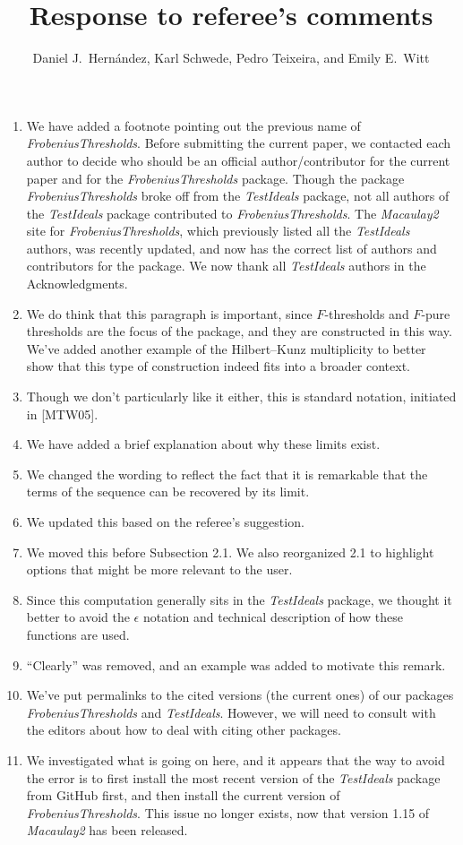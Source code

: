 \documentclass{amsart}
\begin{document}
\title{Response to referee's comments}
\author{Daniel J.\ Hern\'andez,  Karl Schwede, Pedro Teixeira, and Emily E.\ Witt}
\maketitle

\begin{enumerate}
\item We have added a footnote pointing out the previous name of \emph{FrobeniusThresholds}.  Before submitting the current paper, we contacted each author to decide who should be an official author/contributor for the current paper and for the \emph{FrobeniusThresholds} package.
Though the package \emph{FrobeniusThresholds} broke off from the \emph{TestIdeals} package, not all authors of the \emph{TestIdeals} package contributed to \emph{FrobeniusThresholds}.
The \emph{Macaulay2} site for \emph{FrobeniusThresholds}, which previously listed all the \emph{TestIdeals} authors, was recently updated, and now has the correct list of authors and contributors for the package. 
We now thank all \emph{TestIdeals} authors in the Acknowledgments. 
\item We do think that this paragraph is important, since $F$-thresholds and $F$-pure thresholds are the focus of the package, and they are constructed in this way.  We've added another example of the Hilbert--Kunz multiplicity to better show that this type of construction indeed fits into a broader context. 
\item Though we don't particularly like it either, this is standard notation, initiated in [MTW05].
\item We have added a brief explanation about why these limits exist. 
\item We changed the wording to reflect the fact that it is remarkable that the terms of the sequence can be recovered by its limit. 
\item We updated this based on the referee's suggestion. 
\item We moved this before Subsection 2.1.  We also reorganized 2.1 to highlight options that might be more relevant to the user. 
\item Since this computation generally sits in the \emph{TestIdeals} package, we thought it better to avoid the  $\epsilon$ notation and technical description of how these functions are used. 
\item ``Clearly'' was removed, and an example was added to motivate this remark. 
\item We've put permalinks to the cited versions (the current ones) of our packages  \emph{FrobeniusThresholds} and \emph{TestIdeals}. 
However, we will need to consult with the editors about how to deal with citing other packages.  
\item We investigated what is going on here, and it appears that the way to avoid the error is to first install the most recent version of the \emph{TestIdeals} package from GitHub first, and then install the current version of \emph{FrobeniusThresholds}. 
This issue no longer exists, now that version 1.15 of \emph{Macaulay2} has been released.

\end{enumerate}
\end{document}
